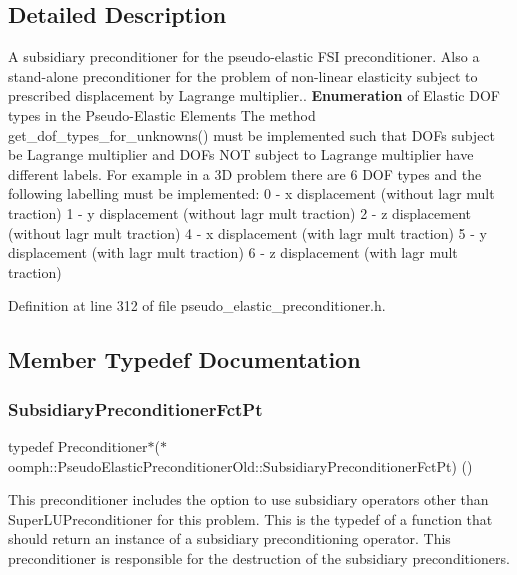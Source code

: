\subsection{Detailed Description}
A subsidiary preconditioner for the pseudo-\/elastic F\+SI preconditioner. Also a stand-\/alone preconditioner for the problem of non-\/linear elasticity subject to prescribed displacement by Lagrange multiplier.. {\bfseries Enumeration} of Elastic D\+OF types in the Pseudo-\/\+Elastic Elements The method get\+\_\+dof\+\_\+types\+\_\+for\+\_\+unknowns() must be implemented such that D\+O\+Fs subject be Lagrange multiplier and D\+O\+Fs N\+OT subject to Lagrange multiplier have different labels. For example in a 3D problem there are 6 D\+OF types and the following labelling must be implemented\+: 0 -\/ x displacement (without lagr mult traction) 1 -\/ y displacement (without lagr mult traction) 2 -\/ z displacement (without lagr mult traction) 4 -\/ x displacement (with lagr mult traction) 5 -\/ y displacement (with lagr mult traction) 6 -\/ z displacement (with lagr mult traction) 

Definition at line 312 of file pseudo\+\_\+elastic\+\_\+preconditioner.\+h.



\subsection{Member Typedef Documentation}
\mbox{\label{classoomph_1_1PseudoElasticPreconditionerOld_a8ee80a4a55139190a6e2a16fa175e75f}} 
\subsubsection{\texorpdfstring{Subsidiary\+Preconditioner\+Fct\+Pt}{SubsidiaryPreconditionerFctPt}}
{\footnotesize\ttfamily typedef Preconditioner$\ast$($\ast$ oomph\+::\+Pseudo\+Elastic\+Preconditioner\+Old\+::\+Subsidiary\+Preconditioner\+Fct\+Pt) ()}



This preconditioner includes the option to use subsidiary operators other than Super\+L\+U\+Preconditioner for this problem. This is the typedef of a function that should return an instance of a subsidiary preconditioning operator. This preconditioner is responsible for the destruction of the subsidiary preconditioners. 



